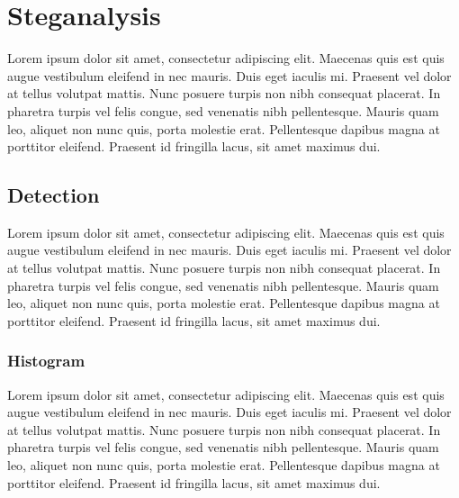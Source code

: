 \section{Steganalysis}
Lorem ipsum dolor sit amet, consectetur adipiscing elit. Maecenas quis est quis augue vestibulum eleifend in nec mauris. Duis eget iaculis mi. Praesent vel dolor at tellus volutpat mattis. Nunc posuere turpis non nibh consequat placerat. In pharetra turpis vel felis congue, sed venenatis nibh pellentesque. Mauris quam leo, aliquet non nunc quis, porta molestie erat. Pellentesque dapibus magna at porttitor eleifend. Praesent id fringilla lacus, sit amet maximus dui.

\subsection*{Detection}
Lorem ipsum dolor sit amet, consectetur adipiscing elit. Maecenas quis est quis augue vestibulum eleifend in nec mauris. Duis eget iaculis mi. Praesent vel dolor at tellus volutpat mattis. Nunc posuere turpis non nibh consequat placerat. In pharetra turpis vel felis congue, sed venenatis nibh pellentesque. Mauris quam leo, aliquet non nunc quis, porta molestie erat. Pellentesque dapibus magna at porttitor eleifend. Praesent id fringilla lacus, sit amet maximus dui.

\subsubsection*{Histogram}
Lorem ipsum dolor sit amet, consectetur adipiscing elit. Maecenas quis est quis augue vestibulum eleifend in nec mauris. Duis eget iaculis mi. Praesent vel dolor at tellus volutpat mattis. Nunc posuere turpis non nibh consequat placerat. In pharetra turpis vel felis congue, sed venenatis nibh pellentesque. Mauris quam leo, aliquet non nunc quis, porta molestie erat. Pellentesque dapibus magna at porttitor eleifend. Praesent id fringilla lacus, sit amet maximus dui.